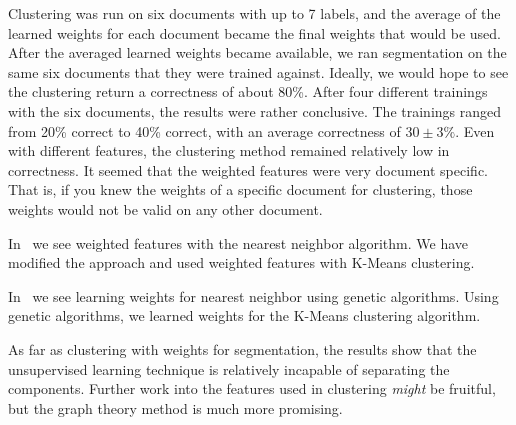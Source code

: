 Clustering was run on six documents with up to 7 labels, and the average of the learned weights for each document became the final weights that would be used.
After the averaged learned weights became available, we ran segmentation on the same six documents that they were trained against.
Ideally, we would hope to see the clustering return a correctness of about 80\%.
After four different trainings with the six documents, the results were rather conclusive.
The trainings ranged from 20\% correct to 40\% correct, with an average correctness of $30\pm 3\%$.
Even with different features, the clustering method remained relatively low in correctness.
It seemed that the weighted features were very document specific. 
That is, if you knew the weights of a specific document for clustering, those weights would not be valid on any other document.






In~\cite{dietrich95weighting} we see weighted features with the nearest neighbor algorithm.
We have modified the approach and used weighted features with K-Means clustering.

In~\cite{demiroz96genetic} we see learning weights for nearest neighbor using genetic algorithms.
Using genetic algorithms, we learned weights for the K-Means clustering algorithm.




As far as clustering with weights for segmentation, the results show that the unsupervised learning technique is relatively incapable of separating the components.
Further work into the features used in clustering \emph{might} be fruitful, but the graph theory method is much more promising.
